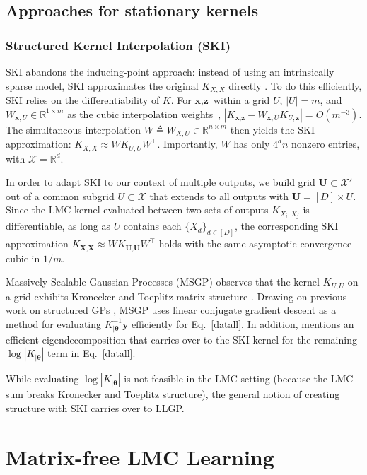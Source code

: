 \documentclass{article}
\def\bsth{{\boldsymbol\theta}}
\def \R {\mathbb{R}}
\def\Tx{\textbf{x}}
\def\TX{\textbf{X}}
\def\TU{\textbf{U}}
\def\Ty{\textbf{y}}
\def\Tz{\textbf{z}}
\newcommand{\card}[1]{\left\vert{#1}\right\vert}
\newcommand{\abs}[1]{\left|#1\right|}
\def \mcX {\mathcal{X}}
\begin{document}
\subsection{Approaches for stationary kernels}

\subsubsection{Structured Kernel Interpolation (SKI)}\label{ski-section}

SKI abandons the inducing-point approach: instead of using an intrinsically sparse model, SKI approximates the original $K_{X,X}$ directly \cite{kiss-gp}. To do this efficiently, SKI relies on the differentiability of $K$. For $\Tx,\Tz$ within a grid $U$, $\card{U}=m$, and $W_{\Tx,U}\in\R^{1\times m}$ as the cubic interpolation weights~\cite{keys1981cubic}, $\abs{K_{\Tx,\Tz}-W_{\Tx,U}K_{U,\Tz}}=O(m^{-3})$. The simultaneous interpolation $W\triangleq W_{X,U}\in\R^{n\times m}$ then yields the SKI approximation: $K_{X,X}\approx WK_{U,U}W^\top$. Importantly, $W$ has only $4^dn$ nonzero entries, with $\mcX=\R^d$.

In order to adapt SKI to our context of multiple outputs, we build grid $\TU\subset\mcX'$ out of a common subgrid $U\subset\mcX$ that extends to all outputs with $\TU = [D]\times U$. Since the LMC kernel evaluated between two sets of outputs $K_{X_i,X_j}$ is differentiable, as long as $U$ contains each $\{X_d\}_{d\in[D]}$, the corresponding SKI approximation $K_{\TX,\TX}\approx WK_{\TU,\TU}W^\top$ holds with the same asymptotic convergence cubic in $1/m$.

Massively Scalable Gaussian Processes (MSGP) observes that the kernel $K_{U,U}$ on a grid exhibits Kronecker and Toeplitz matrix structure \cite{msgp}. Drawing on previous work on structured GPs \cite{cunningham2008fast, gilboa2015scaling}, MSGP uses linear conjugate gradient descent as a method for evaluating $K_{|\bsth}^{-1}\Ty$ efficiently for Eq.~\ref{datall}. In addition, \cite{wilson2014fast} mentions an efficient eigendecomposition that carries over to the SKI kernel for the remaining $\log\abs{K_{|\bsth}}$ term in Eq.~\ref{datall}.

While evaluating $\log\abs{K_{|\bsth}}$ is not feasible in the LMC setting (because the LMC sum breaks Kronecker and Toeplitz structure), the general notion of creating structure with SKI carries over to LLGP.

\section{Matrix-free LMC Learning}
\label{sec:matrix-free}
\end{document}
